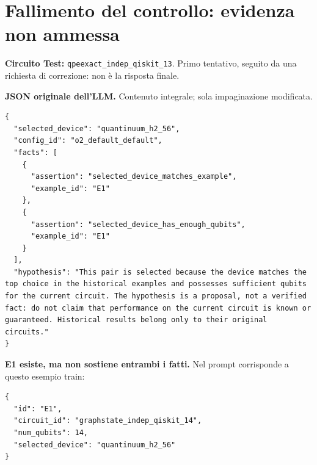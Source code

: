 \documentclass[a4paper,10pt]{article}
\begin{document}
\section*{Fallimento del controllo: evidenza non ammessa}
\textbf{Circuito Test:} \texttt{qpeexact\_indep\_qiskit\_13}.
Primo tentativo, seguito da una richiesta di correzione: non è la risposta finale.\par
\textbf{JSON originale dell'LLM.} Contenuto integrale; sola impaginazione modificata.\par
\begin{lstlisting}
{
  "selected_device": "quantinuum_h2_56",
  "config_id": "o2_default_default",
  "facts": [
    {
      "assertion": "selected_device_matches_example",
      "example_id": "E1"
    },
    {
      "assertion": "selected_device_has_enough_qubits",
      "example_id": "E1"
    }
  ],
  "hypothesis": "This pair is selected because the device matches the top choice in the historical examples and possesses sufficient qubits for the current circuit. The hypothesis is a proposal, not a verified fact: do not claim that performance on the current circuit is known or guaranteed. Historical results belong only to their original circuits."
}
\end{lstlisting}

\textbf{E1 esiste, ma non sostiene entrambi i fatti.} Nel prompt corrisponde a questo esempio train:
\begin{lstlisting}
{
  "id": "E1",
  "circuit_id": "graphstate_indep_qiskit_14",
  "num_qubits": 14,
  "selected_device": "quantinuum_h2_56"
}
\end{lstlisting}
\end{document}
